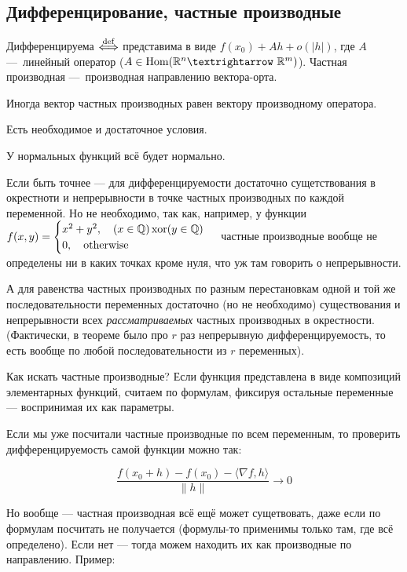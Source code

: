 \documentclass[12pt, a4paper]{article}
\begin{document}
\subsection{Дифференцирование, частные производные}

Дифференцируема $\overset{\mathrm{def}}{\Longleftrightarrow}$ представима в виде $f(x_0) + A h + o(|h|)$, 
где $A$ — линейный оператор ($A \in \operatorname{Hom} (\sR^n → \sR^m)$).
Частная производная — производная направлению вектора-орта.

Иногда вектор частных производных равен вектору производному оператора. 

Есть необходимое и достаточное условия.

\begin{theorem}
  У нормальных функций всё будет нормально.
\end{theorem}

Если быть точнее — для дифференцируемости достаточно сущетствования в окрестноти и непрерывности в точке частных производных по каждой переменной.
Но не необходимо, так как, например, у функции $f(x, y) = \begin{cases}
  x^2 + y^2, \quad (x \in {\mathbb{Q}}) \operatorname{xor} (y \in {\mathbb{Q}}) \\
  0, \quad \mathrm{otherwise}
\end{cases}$ частные производные вообще не определены ни в каких точках кроме нуля, что уж там говорить о непрерывности.

А для равенства частных производных по разным перестановкам одной и той же последовательности переменных
достаточно (но не необходимо) существования и непрерывности всех \textit{рассматриваемых} частных производных в окрестности.
(Фактически, в теореме было про $r$ раз непрерывную дифференцируемость, то есть вообще по любой последовательности из $r$ переменных).


Как искать частные производные?
Если функция представлена в виде композиций элементарных функций, считаем по формулам, 
фиксируя остальные переменные — воспринимая их как параметры.

Если мы уже посчитали частные производные по всем переменным, 
то проверить дифференцируемость самой функции можно так:

\begin{equation}
  \frac{f(x_0 + h) - f(x_0) - \langle \nabla f, h \rangle}{\lVert h \rVert} → 0
\end{equation}

Но вообще — частная производная всё ещё может сущетвовать, 
даже если по формулам посчитать не получается (формулы-то применимы только там, где всё определено).
Если нет — тогда можем находить их как производные по направлению. Пример:
\end{document}

